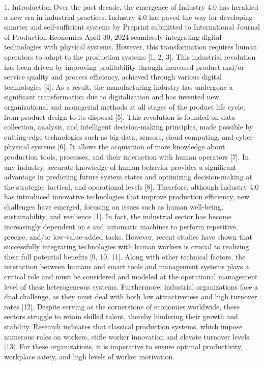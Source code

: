 1.	Introduction
Over the past decade, the emergence of Industry 4.0 has heralded a new era in industrial practices. Industry 4.0 has paved the way for developing smarter and self-sufficient systems by
Preprint submitted to International Journal of Production Economics	April 30, 2024
seamlessly integrating digital technologies with physical systems. However, this transformation requires human operators to adapt to the production systems [1, 2, 3]. This industrial revolution has been driven by improving profitability through increased product and/or service quality and process efficiency, achieved through various digital technologies [4]. As a result, the manufacturing industry has undergone a significant transformation due to digitalization and has invented new organizational and managerial methods at all stages of the product life cycle, from product design to its disposal [5]. This revolution is founded on data collection, analysis, and intelligent decision-making principles, made possible by cutting-edge technologies such as big data, sensors, cloud computing, and cyber-physical systems [6]. It allows the acquisition of more knowledge about production tools, processes, and their interaction with human operators [7]. In any industry, accurate knowledge of human behavior provides a significant advantage in predicting future system states and optimizing decision-making at the strategic, tactical, and operational levels [8]. Therefore, although Industry 4.0 has introduced innovative technologies that improve production efficiency, new challenges have emerged, focusing on issues such as human well-being, sustainability, and resilience [1].
In fact, the industrial sector has become increasingly dependent on s and automatic machines to perform repetitive, precise, and/or low-value-added tasks. However, recent studies have shown that successfully integrating technologies with human workers is crucial to realizing their full potential benefits [9, 10, 11]. Along with other technical factors, the interaction between humans and smart tools and management systems plays a critical role and must be considered and modeled at the operational management level of these heterogeneous systems. Furthermore, industrial organizations face a dual challenge, as they must deal with both low attractiveness and high turnover rates [12]. Despite serving as the cornerstone of economies worldwide, these sectors struggle to retain skilled talent, thereby hindering their growth and stability. Research indicates that classical production systems, which impose numerous rules on workers, stifle worker innovation and elevate turnover levels [13]. For these organizations, it is imperative to ensure optimal productivity, workplace safety, and high levels of worker motivation.
